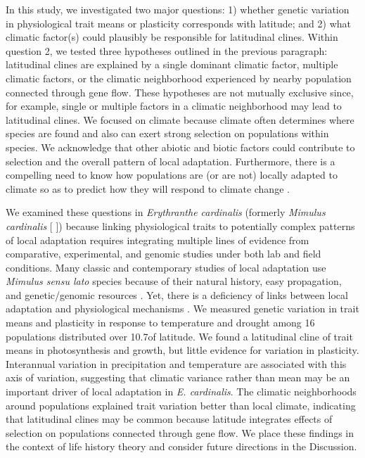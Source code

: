 \documentclass[11pt, oneside]{article}
\begin{document}
In this study, we investigated two major questions: 1) whether genetic variation in physiological trait means or plasticity corresponds with latitude; and 2) what climatic factor(s) could plausibly be responsible for latitudinal clines. Within question 2, we tested three hypotheses outlined in the previous paragraph: latitudinal clines are explained by a single dominant climatic factor, multiple climatic factors, or the climatic neighborhood experienced by nearby population connected through gene flow. These hypotheses are not mutually exclusive since, for example, single or multiple factors in a climatic neighborhood may lead to latitudinal clines. We focused on climate because climate often determines where species are found and also can exert strong selection on populations within species. We acknowledge that other abiotic and biotic factors could contribute to selection and the overall pattern of local adaptation. Furthermore, there is a compelling need to know how populations are (or are not) locally adapted to climate so as to predict how they will respond to climate change \citep{Aitken_Whitlock_2013}. 

We examined these questions in \textit{Erythranthe cardinalis} (formerly \textit{Mimulus cardinalis} [\citeauthor{Nesom_2014} \citeyear{Nesom_2014}]) because linking physiological traits to potentially complex patterns of local adaptation requires integrating multiple lines of evidence from comparative, experimental, and genomic studies under both lab and field conditions. Many classic and contemporary studies of local adaptation use \textit{Mimulus sensu lato} species because of their natural history, easy propagation, and genetic/genomic resources \citep{Clausen_etal_1940, Hiesey_etal_1971, Bradshaw_Schemske_2003, Wu_etal_2008, Lowry_Willis_2010, Wright_etal_2013}. Yet, there is a deficiency of links between local adaptation and physiological mechanisms \citep{Angert_2006, Angert_etal_2008, Wu_etal_2010, Wright_etal_2013}. We measured genetic variation in trait means and plasticity in response to temperature and drought among 16 populations distributed over 10.7\textdegree of latitude. We found a latitudinal cline of trait means in photosynthesis and growth, but little evidence for variation in plasticity. Interannual variation in precipitation and temperature are associated with this axis of variation, suggesting that climatic variance rather than mean may be an important driver of local adaptation in \textit{E. cardinalis}. The climatic neighborhoods around populations explained trait variation better than local climate, indicating that latitudinal clines may be common because latitude integrates effects of selection on populations connected through gene flow. We place these findings in the context of life history theory and consider future directions in the Discussion. 
\end{document}
